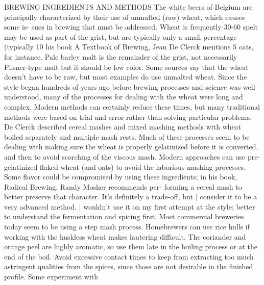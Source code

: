 \documentclass[a4paper,parskip=half]{scrartcl}
\begin{document}
BREWING INGREDIENTS AND METHODS
The white beers of Belgium are principally characterized by
their use of unmalted (raw) wheat, which causes some is-
sues in brewing that must be addressed. Wheat is frequently
30-60%
spelt may be used as part of the grist, but are typically only
a small percentage (typically 10%
his book A Textbook of Brewing, Jean De Clerck mentions 5%
oats, for instance. Pale barley malt is the remainder of the
grist, not necessarily Pilsner-type malt but it should be low
color. Some sources say that the wheat doesn't have to be
raw, but most examples do use unmalted wheat.
Since the style began hundreds of years ago before
brewing processes and science was well-understood, many
of the processes for dealing with the wheat were long and
complex. Modern methods can certainly reduce these times,
but many traditional methods were based on trial-and-error
rather than solving particular problems. De Clerck described
cereal mashes and mixed mashing methods with wheat
boiled separately and multiple mash rests. Much of these
processes seem to be dealing with making sure the wheat is
properly gelatinized before it is converted, and then to avoid
scorching of the viscous mash.
Modern approaches can use pre-gelatinized flaked wheat
(and oats) to avoid the laborious mashing processes. Some
flavor could be compromised by using these ingredients; in
his book, Radical Brewing, Randy Mosher recommends per-
forming a cereal mash to better preserve that character. It’s
definitely a trade-off, but | consider it to be a very advanced
method. | wouldn't use it on my first attempt at the style;
better to understand the fermentation and spicing first. Most
commercial breweries today seem to be using a step mash
process. Homebrewers can use rice hulls if working with the
huskless wheat makes lautering difficult.
The coriander and orange peel are highly aromatic, so
use them late in the boiling process or at the end of the boil.
Avoid excessive contact times to keep from extracting too
much astringent qualities from the spices, since those are
not desirable in the finished profile. Some experiment with
\end{document}
